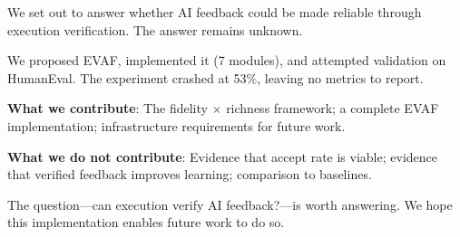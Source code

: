 
We set out to answer whether AI feedback could be made reliable through execution verification. The answer remains unknown.

We proposed EVAF, implemented it (7 modules), and attempted validation on HumanEval. The experiment crashed at 53\%, leaving no metrics to report.

\textbf{What we contribute}: The fidelity $\times$ richness framework; a complete EVAF implementation; infrastructure requirements for future work.

\textbf{What we do not contribute}: Evidence that accept rate is viable; evidence that verified feedback improves learning; comparison to baselines.

The question---can execution verify AI feedback?---is worth answering. We hope this implementation enables future work to do so.
